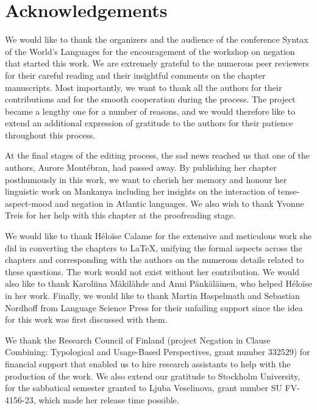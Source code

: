 \documentclass[output=paper,colorlinks,citecolor=brown]{langscibook}
\begin{document}



\section*{Acknowledgements}
We would like to thank the organizers and the audience of the conference Syntax of the World's Languages for the encouragement of the workshop on negation that started this work. We are extremely grateful to the numerous peer reviewers for their careful reading and their insightful comments on the chapter manuscripts. Most importantly, we want to thank all the authors for their contributions and for the smooth cooperation during the process. The project became a lengthy one for a number of reasons, and we would therefore like to extend an additional expression of gratitude to the authors for their patience throughout this process. 

At the final stages of the editing process, the sad news reached us that one of the authors, Aurore Montébran, had passed away. By publishing her chapter posthumously in this work, we want to cherish her memory and honour her linguistic work on Mankanya including her insights on the interaction of tense-aspect-mood and negation in Atlantic languages. We also wish to thank Yvonne Treis for her help with this chapter at the proofreading stage.

We would like to thank Héloïse Calame for the extensive and meticulous work she did in converting the chapters to LaTeX, unifying the formal aspects across the chapters and corresponding with the authors on the numerous details related to these questions. The work would not exist without her contribution. We would also like to thank Karoliina Mäkilähde and Anni Pänkäläinen, who helped Héloïse in her work. Finally, we would like to thank Martin Haspelmath and Sebastian Nordhoff from Language Science Press for their unfailing support since the idea for this work was first discussed with them.

We thank the Research Council of Finland (project Negation in Clause Combining: Typological and Usage-Based Perspectives, grant number 332529) for financial support that enabled us to hire research assistants to help with the production of the work. We also extend our gratitude to Stockholm University, for the sabbatical semester granted to Ljuba Veselinova, grant number SU FV-4156-23, which made her release time possible. 

\sloppy
\printbibliography[heading=subbibliography,notkeyword=this]
\end{document}
